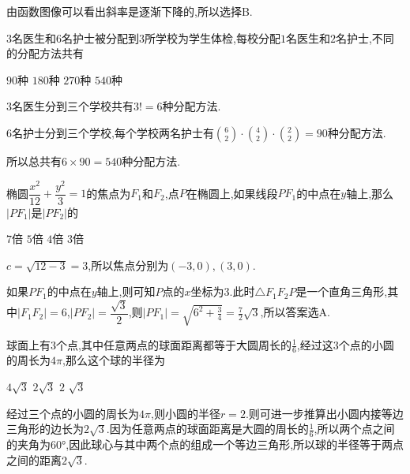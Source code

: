 \begin{questions}
	\begin{solution}
		由函数图像可以看出斜率是逐渐下降的,所以选择B.
	\end{solution}

	\question $3$名医生和$6$名护士被分配到$3$所学校为学生体检,每校分配$1$名医生和$2$名护士,不同的分配方法共有

	\hfs

	\begin{oneparchoices}
		\choice $90$种
		\choice $180$种
		\choice $270$种
		\CorrectChoice $540$种
	\end{oneparchoices}

	\begin{solution}
		$3$名医生分到三个学校共有$3!=6$种分配方法.

		$6$名护士分到三个学校,每个学校两名护士有$\displaystyle\binom{6}{2}\cdot\binom{4}{2}\cdot\binom{2}{2}=90$种分配方法.

		所以总共有$6\times90=540$种分配方法.
	\end{solution}

	\question 椭圆$\dfrac{x^2}{12} + \dfrac{y^2}{3} =
		1$的焦点为$F_1$和$F_2$,点$P$在椭圆上,如果线段$PF_1$的中点在$y$轴上,那么$|PF_1|$是$|PF_2|$的

	\hfs

	\begin{oneparchoices}
		\CorrectChoice $7$倍
		\choice $5$倍
		\choice $4$倍
		\choice $3$倍
	\end{oneparchoices}

	\begin{solution}
		$c=\sqrt{12-3} = 3$,所以焦点分别为$(-3,0), (3,0)$.

		如果$PF_1$的中点在$y$轴上,则可知$P$点的$x$坐标为$3$.此时$\triangle{F_1F_2P}$是一个直角三角形,其中$|F_1F_2|=6$,$|PF_2|=\dfrac{\sqrt{3}}{2}$,则$|PF_1|=\sqrt{6^2+\frac{3}{4}}=\frac72\sqrt{3}$,所以答案选A.
	\end{solution}

	\question
	球面上有$3$个点,其中任意两点的球面距离都等于大圆周长的$\frac16$,经过这$3$个点的小圆的周长为$4\pi$,那么这个球的半径为
	\hfs

	\begin{oneparchoices}
		\choice $4\sqrt{3}$
		\CorrectChoice $2\sqrt{3}$
		\choice $2$
		\choice $\sqrt{3}$
	\end{oneparchoices}

	\begin{solution}
		经过三个点的小圆的周长为$4\pi$,则小圆的半径$r=2$.则可进一步推算出小圆内接等边三角形的边长为$2\sqrt{3}$.因为任意两点的球面距离是大圆的周长的$\frac16$,所以两个点之间的夹角为$\ang{60}$,因此球心与其中两个点的组成一个等边三角形,所以球的半径等于两点之间的距离$2\sqrt{3}$.
	\end{solution}


\end{questions}
